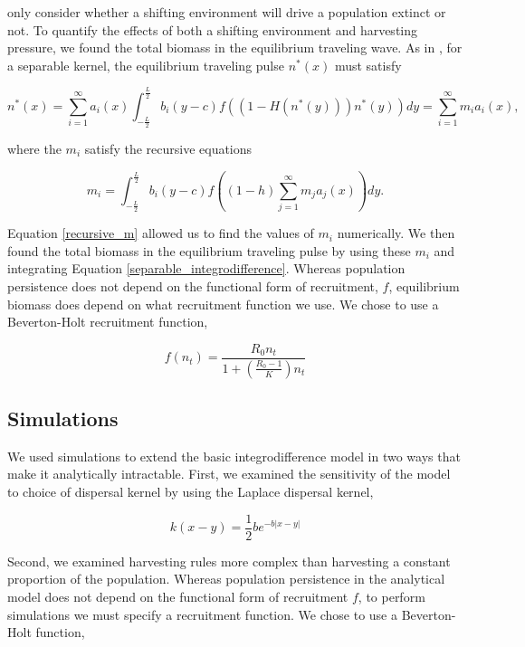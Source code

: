 \documentclass[12pt,english]{article}
\begin{document}
\begin{spacing}{1.9}
\begin{flushleft}
\citet{ZhouKot2011} only consider whether a shifting environment will drive a population extinct or not.  To quantify the effects of both a shifting environment and harvesting pressure, we found the total biomass in the equilibrium traveling wave. As in \citet{Latore:1998fk}, for a separable kernel, the equilibrium traveling pulse $n^*(x)$ must satisfy

\begin{equation}
n^*(x)=\sum^\infty_{i=1}
a_i(x)\int^{\frac{L}{2}}_{-\frac{L}{2}}b_i(y-c)f((1-H(n^*(y)))n^*(y))dy=\sum^\infty_{i=1}m_ia_i(x), \label{separable_integrodifference}
\end{equation}

\noindent where the $m_i$ satisfy the recursive equations

\begin{equation}
m_i=\int^{\frac{L}{2}}_{-\frac{L}{2}}b_i(y-c)f\left((1-h)\sum^\infty_{j=1}m_ja_j(x)\right)
dy. \label{recursive_m}
\end{equation}

\noindent Equation \ref{recursive_m} allowed us to find the values of $m_i$ numerically. We then found the total biomass in the 
equilibrium traveling pulse by using these $m_i$ and integrating Equation \ref{separable_integrodifference}.  Whereas population persistence does not depend on the functional form of recruitment, $f$, equilibrium biomass does depend on what recruitment function we use.  We chose to use a Beverton-Holt recruitment function,

\[f(n_t)=\frac{R_0n_t}{1+\left(\frac{R_0-1}{K}\right)n_t}\]


\subsection{Simulations }

We used simulations to extend the basic integrodifference model in two ways that make it analytically 
intractable. First, we examined the sensitivity of the model to choice of dispersal kernel by using the Laplace 
dispersal kernel, 

\[ k(x-y)=\frac{1}{2}be^{-b|x-y|}\]

\noindent Second, we examined harvesting rules more complex than harvesting a constant proportion of the population. Whereas population persistence in the analytical model does not depend on the functional form of recruitment $f$, to perform simulations we must 
specify a recruitment function.  We chose to use a Beverton-Holt function,


\end{flushleft}
\end{spacing}
\end{document}

